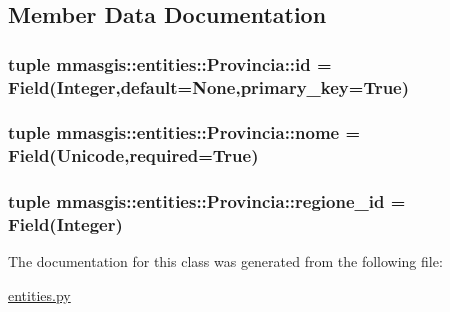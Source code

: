 \subsection{Member Data Documentation}
\hypertarget{classmmasgis_1_1entities_1_1Provincia_a9b51913212d091ce391c69482fa75132}{
\subsubsection[{id}]{\setlength{\rightskip}{0pt plus 5cm}tuple {\bf mmasgis::entities::Provincia::id} = Field(Integer,default=None,primary\_\-key=True)}}
\label{classmmasgis_1_1entities_1_1Provincia_a9b51913212d091ce391c69482fa75132}
\hypertarget{classmmasgis_1_1entities_1_1Provincia_a22d51ee2a84259d19cc2e45f825d4f5e}{
\subsubsection[{nome}]{\setlength{\rightskip}{0pt plus 5cm}tuple {\bf mmasgis::entities::Provincia::nome} = Field(Unicode,required=True)}}
\label{classmmasgis_1_1entities_1_1Provincia_a22d51ee2a84259d19cc2e45f825d4f5e}
\hypertarget{classmmasgis_1_1entities_1_1Provincia_ac69d47be8b45a7e4b939df72e5847bd0}{
\subsubsection[{regione\_\-id}]{\setlength{\rightskip}{0pt plus 5cm}tuple {\bf mmasgis::entities::Provincia::regione\_\-id} = Field(Integer)}}
\label{classmmasgis_1_1entities_1_1Provincia_ac69d47be8b45a7e4b939df72e5847bd0}


The documentation for this class was generated from the following file:\begin{DoxyCompactItemize}
\item 
\hyperlink{entities_8py}{entities.py}\end{DoxyCompactItemize}

